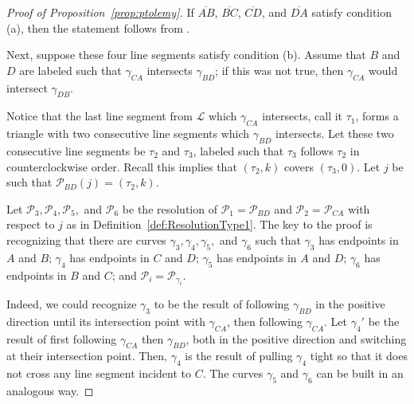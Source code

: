 \documentclass{article}
\theoremstyle{remark}
\newcommand{\calP}{\mathcal{P}}
\begin{document}
\begin{proof}[Proof of Proposition~\ref{prop:ptolemy}]
If $\overline{AB}$, $\overline{BC}$, $\overline{CD}$, and $\overline{DA}$  satisfy condition (a), then the statement follows from \cite[Proposition 49]{banaian2025}. 

Next, suppose these four line segments satisfy condition (b). Assume that $B$ and $D$ are labeled such that $\gamma_{CA}$ intersects $\gamma_{BD}$; if this was not true, then $\gamma_{CA}$ would intersect $\gamma_{DB}$. 

Notice that the last line segment from $\mathcal{L}$ which $\gamma_{CA}$ intersects, call it $\tau_1$, forms a triangle with two consecutive line segments which $\gamma_{BD}$ intersects. Let these two consecutive line segments be $\tau_2$ and $\tau_3$, labeled such that $\tau_3$ follows $\tau_2$ in counterclockwise order. Recall this implies that $(\tau_2,k)$ covers $(\tau_3,0)$. Let $j$ be such that $\calP_{BD}(j) =(\tau_2,k)$.

\begin{center}
\end{center}

Let $\calP_3,\calP_4,\calP_5,$ and $\calP_6$ be the resolution of $\calP_1 = \calP_{BD}$ and $\calP_2 = \calP_{CA}$ with respect to $j$ as in Definition~\ref{def:ResolutionType1}. The key to the proof is recognizing that there are curves $\gamma_3,\gamma_4,\gamma_5,$ and $\gamma_6$ such that $\gamma_3$ has endpoints in $A$ and $B$;  $\gamma_4$ has endpoints in $C$ and $D$;  $\gamma_5$ has endpoints in $A$ and $D$;  $\gamma_6$ has endpoints in $B$ and $C$; and $\calP_i = \calP_{\gamma_i}$. 

Indeed, we could recognize $\gamma_3$ to be the result of following $\gamma_{BD}$ in the positive direction until its intersection point with $\gamma_{CA}$, then following $\gamma_{CA}$. Let $\gamma_4'$ be the result of first following $\gamma_{CA}$ then $\gamma_{BD}$, both in the positive direction and switching at their intersection point. Then, $\gamma_4$ is the result of pulling $\gamma_4$ tight so that it does not cross any line segment incident to $C$. The curves $\gamma_5$ and $\gamma_6$ can be built in an analogous way. 


\end{proof}
\end{document}
